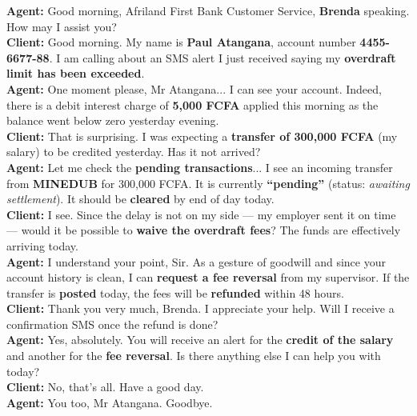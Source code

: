 \documentclass[11pt]{article}
\begin{document}
\begin{exoresolu}
    \begin{textebox}
    \textbf{Agent:} Good morning, Afriland First Bank Customer Service, \textbf{Brenda} speaking. How may I assist you?\\
    \textbf{Client:} Good morning. My name is \textbf{Paul Atangana}, account number \textbf{4455-6677-88}. I am calling about an SMS alert I just received saying my \textbf{overdraft limit has been exceeded}.\\
    \textbf{Agent:} One moment please, Mr Atangana... I can see your account. Indeed, there is a debit interest charge of \textbf{5,000 FCFA} applied this morning as the balance went below zero yesterday evening.\\
    \textbf{Client:} That is surprising. I was expecting a \textbf{transfer of 300,000 FCFA} (my salary) to be credited yesterday. Has it not arrived?\\
    \textbf{Agent:} Let me check the \textbf{pending transactions}... I see an incoming transfer from \textbf{MINEDUB} for 300,000 FCFA. It is currently \textbf{“pending”} (status: \textit{awaiting settlement}). It should be \textbf{cleared} by end of day today.\\
    \textbf{Client:} I see. Since the delay is not on my side — my employer sent it on time — would it be possible to \textbf{waive the overdraft fees}? The funds are effectively arriving today.\\
    \textbf{Agent:} I understand your point, Sir. As a gesture of goodwill and since your account history is clean, I can \textbf{request a fee reversal} from my supervisor. If the transfer is \textbf{posted} today, the fees will be \textbf{refunded} within 48 hours.\\
    \textbf{Client:} Thank you very much, Brenda. I appreciate your help. Will I receive a confirmation SMS once the refund is done?\\
    \textbf{Agent:} Yes, absolutely. You will receive an alert for the \textbf{credit of the salary} and another for the \textbf{fee reversal}. Is there anything else I can help you with today?\\
    \textbf{Client:} No, that’s all. Have a good day.\\
    \textbf{Agent:} You too, Mr Atangana. Goodbye.
    \end{textebox}
    

\end{exoresolu}
\end{document}
